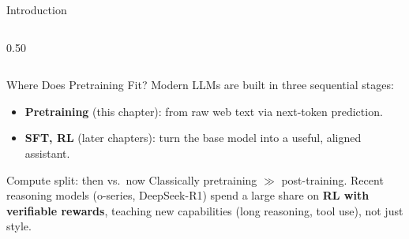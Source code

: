 \begin{frame}{Introduction}
\begin{columns}
\begin{column}{0.50\textwidth}
    \end{column}
  \end{columns}
\end{frame}

\begin{frame}{Where Does Pretraining Fit?}
  Modern LLMs are built in three sequential stages:


  \begin{itemize}
    \itemsep0.1em
    \item \textbf{Pretraining} (this chapter):  from raw web text via next-token prediction.
    \item \textbf{SFT, RL} (later chapters): turn the base model into a useful, aligned assistant.
  \end{itemize}

  \begin{alertblock}{Compute split: then vs.\ now}
    Classically pretraining $\gg$ post-training. Recent reasoning models (o-series, DeepSeek-R1) spend a large share on \textbf{RL with verifiable rewards}, teaching new capabilities (long reasoning, tool use), not just style.
  \end{alertblock}
\end{frame}

